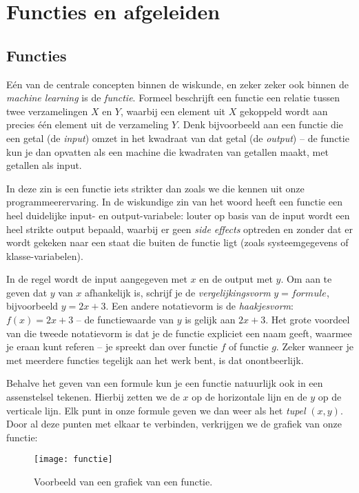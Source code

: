 \section{Functies en afgeleiden}



\subsection{Functies}

Eén van de centrale concepten binnen de wiskunde, en zeker zeker ook binnen de \textit{machine learning} is de \textit{functie}. Formeel beschrijft een functie een relatie tussen twee verzamelingen $X$ en $Y$, waarbij een element uit $X$ gekoppeld wordt aan precies één element uit de verzameling $Y$. Denk bijvoorbeeld aan een functie die een getal (de \textit{input}) omzet in het kwadraat van dat getal (de \textit{output}) – de functie kun je dan opvatten als een machine die kwadraten van getallen maakt, met getallen als input. 

In deze zin is een functie iets strikter dan zoals we die kennen uit onze programmeerervaring. In de wiskundige zin van het woord heeft een functie een heel duidelijke input- en output-variabele: louter op basis van de input wordt een heel strikte output bepaald, waarbij er geen \textit{side effects} optreden en zonder dat er wordt gekeken naar een staat die buiten de functie ligt (zoals systeemgegevens of klasse-variabelen).

In de regel wordt de input aangegeven met $x$ en de output met $y$. Om aan te geven dat $y$ van $x$ afhankelijk is, schrijf je de \textit{vergelijkingsvorm} $y=formule$, bijvoorbeeld $y=2x+3$. Een andere notatievorm is de \textit{haakjesvorm}: $f(x) = 2x+3$ – de functiewaarde van $y$ is gelijk aan $2x+3$. Het grote voordeel van die tweede notatievorm is dat je de functie expliciet een naam geeft, waarmee je eraan kunt referen – je spreekt dan over functie $f$ of functie $g$. Zeker wanneer je met meerdere functies tegelijk aan het werk bent, is dat onontbeerlijk. 

Behalve het geven van een formule kun je een functie natuurlijk ook in een assenstelsel tekenen. Hierbij zetten we de $x$ op de horizontale lijn en de $y$ op de verticale lijn. Elk punt in onze formule geven we dan weer als het \textit{tupel} $(x,y)$. Door al deze punten met elkaar te verbinden, verkrijgen we de grafiek van onze functie:

\begin{figure}[h!]
    \centering
    \texttt{[image: functie]}
    \caption{Voorbeeld van een grafiek van een functie.\label{img:functie}}
\end{figure}

